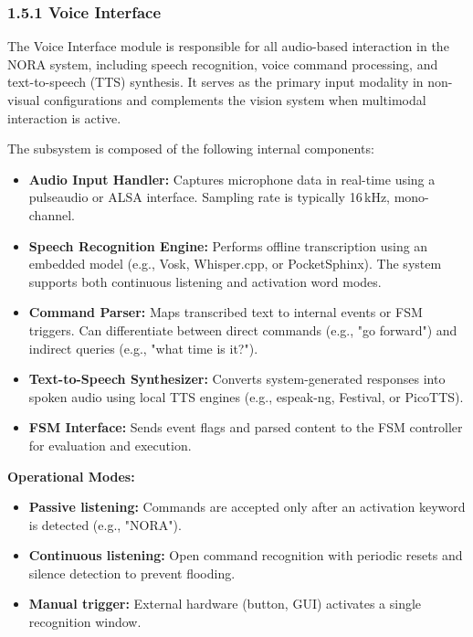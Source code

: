 \subsubsection*{1.5.1 Voice Interface}

The Voice Interface module is responsible for all audio-based interaction in the NORA system, including speech recognition, voice command processing, and text-to-speech (TTS) synthesis. It serves as the primary input modality in non-visual configurations and complements the vision system when multimodal interaction is active.

The subsystem is composed of the following internal components:

\begin{itemize}
\item \textbf{Audio Input Handler:} Captures microphone data in real-time using a pulseaudio or ALSA interface. Sampling rate is typically 16 kHz, mono-channel.\item \textbf{Speech Recognition Engine:} Performs offline transcription using an embedded model (e.g., Vosk, Whisper.cpp, or PocketSphinx). The system supports both continuous listening and activation word modes.
    \item \textbf{Command Parser:} Maps transcribed text to internal events or FSM triggers. Can differentiate between direct commands (e.g., "go forward") and indirect queries (e.g., "what time is it?").
    \item \textbf{Text-to-Speech Synthesizer:} Converts system-generated responses into spoken audio using local TTS engines (e.g., espeak-ng, Festival, or PicoTTS).
    \item \textbf{FSM Interface:} Sends event flags and parsed content to the FSM controller for evaluation and execution.
\end{itemize}

\vspace{0.5cm}

\noindent\textbf{Operational Modes:}
\begin{itemize}
    \item \textbf{Passive listening:} Commands are accepted only after an activation keyword is detected (e.g., "NORA").
    \item \textbf{Continuous listening:} Open command recognition with periodic resets and silence detection to prevent flooding.
    \item \textbf{Manual trigger:} External hardware (button, GUI) activates a single recognition window.
\end{itemize}

